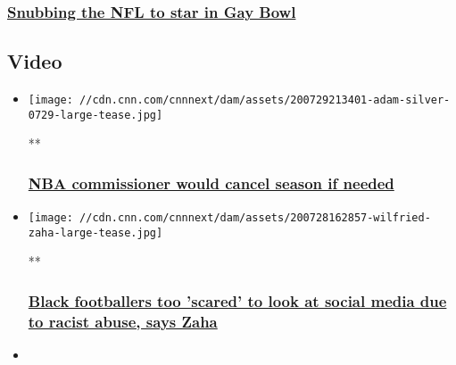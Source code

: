 \hypertarget{snubbing-the-nfl-to-star-in-gay-bowl}{%
\subsubsection{\texorpdfstring{\href{/2018/10/17/sport/gay-bowl-xviii-nfl-denver-broncos-intl-spt/index.html}{Snubbing
the NFL to star in Gay
Bowl}}{Snubbing the NFL to star in Gay Bowl}}\label{snubbing-the-nfl-to-star-in-gay-bowl}}

\hypertarget{video-}{%
\subsection{Video~}\label{video-}}

\begin{itemize}
\item
  \href{/videos/sports/2020/07/30/adam-silver-nba-commissioner-bubble-florida-season-restarting-basketball-spt-intl.cnn}{}

  \texttt{[image: //cdn.cnn.com/cnnnext/dam/assets/200729213401-adam-silver-0729-large-tease.jpg]}

  **

  \hypertarget{nba-commissioner-would-cancel-season-if-needed}{%
  \subsubsection{\texorpdfstring{\href{/videos/sports/2020/07/30/adam-silver-nba-commissioner-bubble-florida-season-restarting-basketball-spt-intl.cnn}{NBA
  commissioner would cancel season if
  needed}}{NBA commissioner would cancel season if needed}}\label{nba-commissioner-would-cancel-season-if-needed}}
\item
  \href{/videos/sports/2020/07/28/wilfried-zaha-racist-abuse-social-media-black-lives-matter-football-spt-intl.cnn}{}

  \texttt{[image: //cdn.cnn.com/cnnnext/dam/assets/200728162857-wilfried-zaha-large-tease.jpg]}

  **

  \hypertarget{black-footballers-too-scared-to-look-at-social-media-due-to-racist-abuse-says-zaha}{%
  \subsubsection{\texorpdfstring{\href{/videos/sports/2020/07/28/wilfried-zaha-racist-abuse-social-media-black-lives-matter-football-spt-intl.cnn}{Black
  footballers too 'scared' to look at social media due to racist abuse,
  says
  Zaha}}{Black footballers too 'scared' to look at social media due to racist abuse, says Zaha}}\label{black-footballers-too-scared-to-look-at-social-media-due-to-racist-abuse-says-zaha}}
\item
  \href{/videos/sports/2020/07/29/cesc-fabregas-time-out-football-racism-coronavirus-arsenal-chelsea-spt-intl-orig-lon.cnn}{}


\end{itemize}
